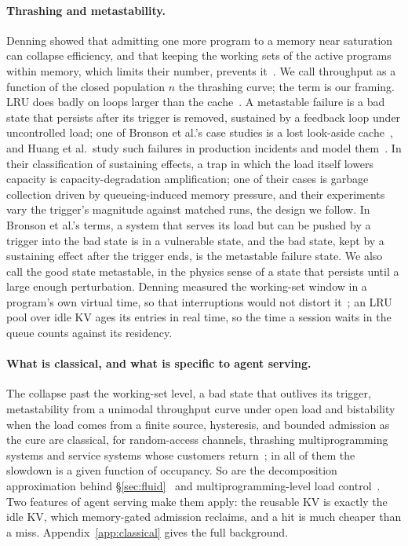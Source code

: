 \paragraph{Thrashing and metastability.}
Denning showed that admitting one more program to a memory near saturation can collapse efficiency, and that keeping the working sets of the active programs within memory, which limits their number, prevents it~\citep{denning1968thrashing,denning1968working}. We call throughput as a function of the closed population $n$ the thrashing curve; the term is our framing. LRU does badly on loops larger than the cache~\citep{chou1985evaluation,smaragdakis1999eelru}. A metastable failure is a bad state that persists after its trigger is removed, sustained by a feedback loop under uncontrolled load; one of Bronson et al.'s case studies is a lost look-aside cache~\citep{bronson2021metastable}, and Huang et al.\ study such failures in production incidents and model them~\citep{huang2022metastable}. In their classification of sustaining effects, a trap in which the load itself lowers capacity is capacity-degradation amplification; one of their cases is garbage collection driven by queueing-induced memory pressure, and their experiments vary the trigger's magnitude against matched runs, the design we follow. In Bronson et al.'s terms, a system that serves its load but can be pushed by a trigger into the bad state is in a vulnerable state, and the bad state, kept by a sustaining effect after the trigger ends, is the metastable failure state. We also call the good state metastable, in the physics sense of a state that persists until a large enough perturbation. Denning measured the working-set window in a program's own virtual time, so that interruptions would not distort it~\citep{denning2005locality}; an LRU pool over idle KV ages its entries in real time, so the time a session waits in the queue counts against its residency.

\paragraph{What is classical, and what is specific to agent serving.}
The collapse past the working-set level, a bad state that outlives its trigger, metastability from a unimodal throughput curve under open load and bistability when the load comes from a finite source, hysteresis, and bounded admission as the cure are classical, for random-access channels, thrashing multiprogramming systems and service systems whose customers return~\citep{kleinrock1975aloha,carleial1975bistable,courtois1975decomposability,nelson1987stochastic,chan2014speedup}; in all of them the slowdown is a given function of occupancy. So are the decomposition approximation behind \S\ref{sec:fluid}~\citep{courtois1975decomposability,kleinrock1975aloha} and multiprogramming-level load control~\citep{denning1976optimal,heiss1991adaptive,schroeder2006mpl}. Two features of agent serving make them apply: the reusable KV is exactly the idle KV, which memory-gated admission reclaims, and a hit is much cheaper than a miss. Appendix~\ref{app:classical} gives the full background.
